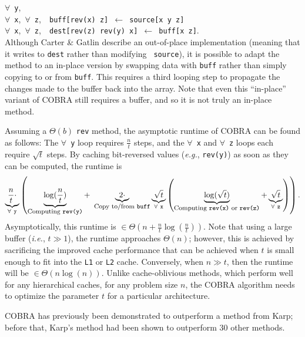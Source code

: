 \documentclass[10pt]{article}
\begin{document}
\noindent $\forall$~{\tt y},\\
\mbox{} \quad $\forall$~{\tt x},~$\forall$~{\tt z},~{\tt
  buff[rev(x)~z]~$\gets$~source[x~y~z]}\\
\mbox{} \quad $\forall$~{\tt x},~$\forall$~{\tt z},~{\tt
  dest[rev(z)~rev(y)~x]~$\gets$~buff[x~z]}.\\

Although Carter \& Gatlin describe an out-of-place implementation
(meaning that it writes to {\tt dest} rather than modifying {\tt
  source}), it is possible to adapt the method to an in-place version
by swapping data with {\tt buff} rather than simply copying to or from
{\tt buff}. This requires a third looping step to propagate the
changes made to the buffer back into the array. Note that even this
``in-place'' variant of COBRA still requires a buffer, and so it is
not truly an in-place method.

Assuming a $\Theta(b)$ {\tt rev} method, the asymptotic runtime of
COBRA can be found as follows: The $\forall$~{\tt y} loop requires
$\frac{n}{t}$ steps, and the $\forall$~{\tt x} and $\forall$~{\tt z}
loops each require $\sqrt{t}$ steps. By caching bit-reversed values
(\emph{e.g.}, {\tt rev(y)}) as soon as they can be computed, the
runtime is
\[
\underbrace{\frac{n}{t} \cdot }_{\forall~{\tt y}} \left( \underbrace{ \log(\frac{n}{t}) }_{\mbox{\footnotesize Computing {\tt rev(y)}}} +~ \underbrace{2 \cdot}_{\mbox{\footnotesize Copy to/from {\tt buff}}} \underbrace{\sqrt{t}}_{\forall~{\tt x}} \left(
\underbrace{\log(\sqrt{t})}_{\mbox{\footnotesize Computing {\tt rev(x)} or {\tt rev(z)}}} + \underbrace{\sqrt{t}}_{\forall~{\tt z}} \right) \right).
\]
Asymptotically, this runtime is $\in \Theta\left( n + \frac{n}{t}
\log(\frac{n}{t}) \right)$. Note that using a large buffer
(\emph{i.e.}, $t \gg 1$), the runtime approaches $\Theta\left( n
\right)$; however, this is achieved by sacrificing the improved cache
performance that can be achieved when $t$ is small enough to fit into
the {\tt L1} or {\tt L2} cache. Conversely, when $n \gg t$, then the
runtime will be $\in \Theta(n \log(n))$. Unlike cache-oblivious
methods, which perform well for any hierarchical caches, for any
problem size $n$, the COBRA algorithm needs to optimize the parameter
$t$ for a particular architecture.

COBRA has previously been demonstrated to outperform a method from
Karp\cite{carter:towards}; before that, Karp's method had been shown
to outperform 30 other methods\cite{karp:bit}.\newline
\end{document}
